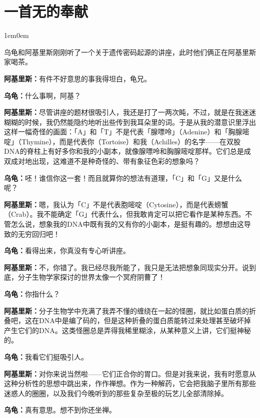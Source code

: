 \documentclass[
  12pt,
  twoside,
  openright,
  oldfontcommands,
]{memoir}
\newcommand{\dialogname}[1]{{\heifamily\bfseries #1}}
\newenvironment{dialogguide}{%
  \begin{adjustwidth}{1em}{0em}\kaitifamily\itshape\small%
}{%
  \end{adjustwidth}%
}
\begin{document}
\label{Dialog09.xhtml}{}

\section[一首无的奉献]{\texorpdfstring{一首无的奉献}{一首无的奉献}}

\begin{dialogguide}
乌龟和阿基里斯刚刚听了一个关于遗传密码起源的讲座，此时他们俩正在阿基里斯家喝茶。
\end{dialogguide}

\dialogname{阿基里斯：}有件不好意思的事我得坦白，龟兄。

\dialogname{乌龟：}什么事啊，阿基？

\dialogname{阿基里斯：}尽管讲座的题材很吸引人，我还是打了一两次盹，不过，就是在我迷迷糊糊的时候，我仍然能隐约地听出些传到我耳朵里的词。于是从我的潜意识里浮出这样一幅奇怪的画面：「A」和「T」不是代表「腺嘌呤」（Adenine）和「胸腺嘧啶」（Thymine），而是代表你（Tortoise）和我（Achilles）的名字------在双股DNA的脊柱上有好多你和我的小副本，就像腺嘌呤和胸腺嘧啶那样。它们总是成双成对地出现，这难道不是种奇怪的、带有象征色彩的想象吗？

\dialogname{乌龟：}呸！谁信你这一套！而且就算你的想法有道理，「C」和「G」又是什么呢？

\dialogname{阿基里斯：}嗯，我认为「C」不是代表胞嘧啶（Cytosine），而是代表螃蟹（Crab）。我不能确定「G」代表什么，但我敢肯定可以把它看作是某种东西。不管怎么说，想象我的DNA中既有我的又有你的小副本，是挺有趣的。想想由这导致的无穷回归吧！

\dialogname{乌龟：}看得出来，你真没有专心听讲座。

\dialogname{阿基里斯：}不，你错了。我已经尽我所能了，我只是无法把想象同现实分开。说到底，分子生物学家探讨的世界太像一个冥府阴曹了！

\dialogname{乌龟：}你指什么？

\dialogname{阿基里斯：}分子生物学中充满了我弄不懂的缠绕在一起的怪圈，就比如蛋白质的折叠吧，这在DNA中是编了码的，但是这种折叠的蛋白质能转过来处理甚至破坏掉产生它们的DNA。这类怪圈总是弄得我稀里糊涂，从某种意义上讲，它们挺神秘的。

\dialogname{乌龟：}我看它们挺吸引人。

\dialogname{阿基里斯：}对你来说当然啦------它们正合你的胃口。但是对我来说，我有时愿意从这种分析性的思想中跳出来，作作禅想。作为一种解药，它会把我脑子里所有那些迷惑人的圈圈，以及我们今晚听到的那些复杂至极的玩艺儿全部清除掉。

\dialogname{乌龟：}真有意思。想不到你还坐禅。
\end{document}
